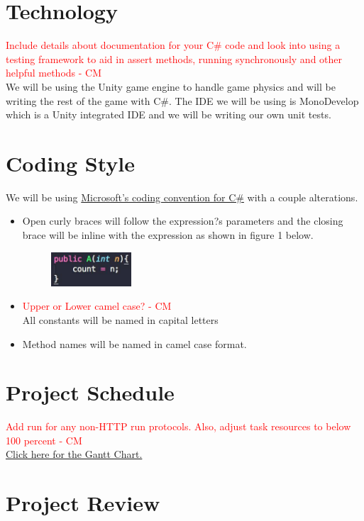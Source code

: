 \documentclass{article}
\begin{document}
\section{Technology}
\textcolor{red}{Include details about documentation for your C\# code and look into using a testing framework to aid in assert methods, running synchronously and other helpful methods - CM} \\
We will be using the Unity game engine to handle game physics and will be writing the rest of the game with C\#.
The IDE we will be using is MonoDevelop which is a Unity integrated IDE and we will be writing our own unit tests.



\section{Coding Style}
We will be using \href{https://msdn.microsoft.com/en-us/library/ff926074.aspx}{Microsoft's coding convention for C\#} with a couple alterations.
\begin{itemize}

  \item Open curly braces will follow the expression?s parameters and the closing brace will be inline with the expression as shown in figure 1 below.

\begin{figure}[H]
\centering
  \includegraphics[width=30mm,scale = 0.25]{curlyBraces.jpg}
\end{figure}

  \item \textcolor{red}{Upper or Lower camel case? - CM} \\ All constants will be named in capital letters

  \item Method names will be named in camel case format.

\end{itemize}

\section{Project Schedule}
\textcolor{red}{Add run for any non-HTTP run protocols. Also, adjust task resources to below 100 percent  - CM} \\
\href{run:../../ProjectSchedule/ProjectSchedule.gan}{Click here for the Gantt Chart.}

\section{Project Review}
\end{document}
